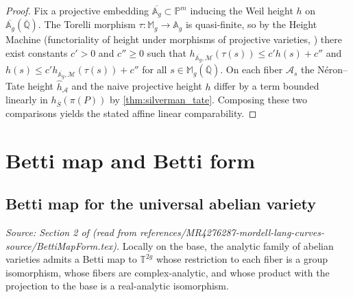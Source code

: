\begin{proof}
  Fix a projective embedding \(\overline{\mathbb{A}_g} \subset \mathbb{P}^m\) inducing
  the Weil height \(h\) on \(\overline{\mathbb{A}_g}(\overline{\mathbb{Q}})\).
  The Torelli morphism \(\tau \colon \mathbb{M}_g \to \mathbb{A}_g\) is quasi-finite,
  so by the Height Machine (functoriality of height under morphisms of projective varieties,
  \cite[Lemma~4]{Silverman:heightest11}) there exist constants \(c' > 0\) and \(c'' \ge 0\)
  such that \(h_{\overline{\mathbb{A}_g},\mathcal{M}}(\tau(s)) \le c' h(s) + c''\)
  and \(h(s) \le c' h_{\overline{\mathbb{A}_g},\mathcal{M}}(\tau(s)) + c''\)
  for all \(s \in \mathbb{M}_g(\overline{\mathbb{Q}})\).
  On each fiber \(\mathcal{A}_s\) the Néron--Tate height \(\hat{h}_{\mathcal{A}}\) and
  the naive projective height \(h\) differ by a term bounded linearly in
  \(h_{\overline{S}}(\pi(P))\) by \cref{thm:silverman_tate}.
  Composing these two comparisons yields the stated affine linear comparability.
\end{proof}

\section{Betti map and Betti form}

\subsection{Betti map for the universal abelian variety}

\begin{proposition}
  \label{prop:betti_map}
  \textit{Source: Section 2 of \cite{MR4276287-mordell-lang-curves} (read from references/MR4276287-mordell-lang-curves-source/BettiMapForm.tex).}
  Locally on the base, the analytic family of abelian varieties admits a Betti
  map to \(\mathbb{T}^{2g}\) whose restriction to each fiber is a group
  isomorphism, whose fibers are complex-analytic, and whose product with the
  projection to the base is a real-analytic isomorphism.
\end{proposition}

